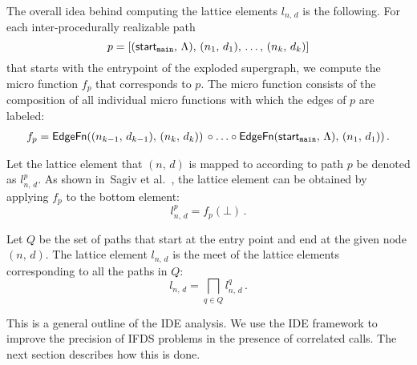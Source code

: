 The overall idea behind computing the lattice elements $l_{n,\,d}$ is the following. For each inter-procedurally realizable path
\[
  p=\left[(\textsf{start}_\texttt{main},\,\Lambda),\,(n_1,\,d_1),\,\dots,\,(n_k,\,d_k)\right]
\]
 that starts with the entrypoint of the exploded supergraph, we compute the micro function $f_p$ that corresponds to $p$. The micro function consists of the composition of all individual micro functions with which the edges of $p$ are labeled:
\begin{align}
  f_p=\textsf{EdgeFn}((n_{k-1},\,d_{k-1}),\,(n_k,\,d_k))\,\circ\ldots\circ
      \textsf{EdgeFn}(\textsf{start}_\texttt{main},\,\Lambda),\,(n_1,\,d_1))\,.
\end{align}

Let the lattice element that $(n,\,d)$ is mapped to according to path $p$ be denoted as $l_{n,\,d}^p$. As shown in~Sagiv et al.~\cite{sagiv1996precise}, the lattice element can be obtained by applying $f_p$ to the bottom element:
\begin{equation}
 l^p_{n,\,d}=f_p(\bot)\,.
\end{equation}

Let $Q$ be the set of paths that start at the entry point and end at the given node $(n,\,d)$.
The lattice element $l_{n,\,d}$ is the meet of the lattice elements corresponding to all the paths in $Q$:
\[
  l_{n,\,d}=\bigsqcap_{q\in Q}l^q_{n,\,d}\,.
\]

This is a general outline of the IDE analysis. We use the IDE framework to improve the precision of IFDS problems in the presence of correlated calls.
The next section describes how this is done.

